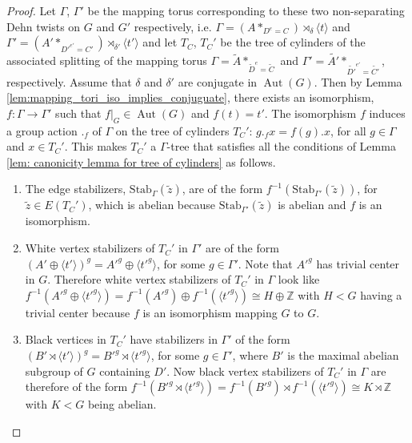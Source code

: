 \documentclass{amsart}
\DeclareMathOperator{\Aut}{Aut}
\theoremstyle{plain}
\theoremstyle{definition}
\theoremstyle{remark}
\begin{document}
\begin{proof}

Let $\Gamma$, $\Gamma'$ be the mapping torus corresponding to these two non-separating Dehn twists on $G$ and $G'$ respectively, i.e. $\Gamma = (A*_{D^e = C}) \rtimes_\delta \langle t \rangle$ and $\Gamma' = (A'*_{D'^{e'} = C'}) \rtimes_{\delta'} \langle t' \rangle$ and let $T_C$, $T_C'$ be the tree of cylinders of the associated splitting of the mapping torus $\Gamma = \tilde{A}*_{\tilde{D}^e = \tilde{C}}$ and $\Gamma' = \tilde{A'}*_{\tilde{D'}^{e'} = \tilde{C'}}$, respectively. Assume that $\delta$ and $\delta'$ are conjugate in $\Aut(G)$. Then by Lemma \ref{lem:mapping_tori_iso_implies_conjuguate}, there exists an isomorphism, $f: \Gamma \to \Gamma'$ such that $f|_G \in \Aut(G)$ and  $f(t)=t'$. The isomorphism $f$ induces a group action $._f$ of $\Gamma$ on the tree of cylinders $T_C'$: $g ._f x = f(g).x$, for all $g \in \Gamma$ and $x \in T_C'$. This makes $T_C'$ a $\Gamma$-tree that satisfies all the conditions of Lemma \ref{lem: canonicity lemma for tree of cylinders} as follows.

\begin{enumerate}
    \item The edge stabilizers, $\mathrm{Stab}_\Gamma(\tilde{z})$, are of the form $f^{-1}(\mathrm{Stab}_{\Gamma'}(\tilde{z}))$, for $\tilde{z} \in E(T_C')$, which is abelian because $\mathrm{Stab}_{\Gamma'}(\tilde{z})$ is abelian and $f$ is an isomorphism.

    \item White vertex stabilizers of $T_C'$ in $\Gamma'$ are of the form $(A' \oplus \langle t' \rangle)^g = A'^g \oplus \langle t'^g \rangle$, for some $g \in \Gamma'$. Note that $A'^g$ has trivial center in $G$. Therefore white vertex stabilizers of $T_C'$ in $\Gamma$ look like $f^{-1}(A'^g \oplus \langle t'^g \rangle) = f^{-1}(A'^g) \oplus f^{-1}(\langle t'^g \rangle) \cong H \oplus \mathbb{Z}$ with $H < G$ having a trivial center because $f$ is an isomorphism mapping $G$ to $G$.

    \item Black vertices in $T_C'$ have stabilizers in $\Gamma'$ of the form $(B' \rtimes \langle t' \rangle)^g = B'^g \rtimes \langle t'^g \rangle$, for some $g \in \Gamma'$, where $B'$ is the maximal abelian subgroup of $G$ containing $D'$. Now black vertex stabilizers of $T_C'$ in $\Gamma$ are therefore of the form $f^{-1}(B'^g \rtimes \langle t'^g \rangle) = f^{-1}(B'^g) \rtimes f^{-1}(\langle t'^g \rangle) \cong K \rtimes \mathbb{Z}$ with $K < G$ being abelian.


\end{enumerate}
\end{proof}
\end{document}
